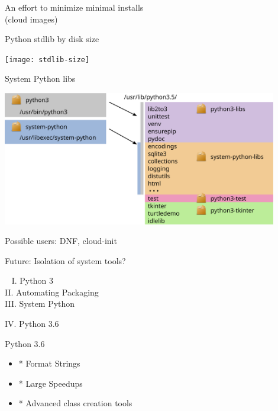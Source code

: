 \documentclass[1610,20pt]{beamer}
\newcommand\sk{\par\bigskip\bigskip\par}
\begin{document}
\begin{center}
\begin{frame}[fragile]
    \sk

    An effort to minimize minimal installs \\
    (cloud images)
\end{frame}

\begin{frame}[fragile]
    Python stdlib by disk size
    \sk

    \texttt{[image: stdlib-size]}
\end{frame}

\begin{frame}[fragile]
    System Python libs
    \sk

    \includegraphics[width=0.9\textwidth]{system-python}
\end{frame}

\begin{frame}[fragile]
    Possible users: DNF, cloud-init

    \sk\pause

    Future: Isolation of system tools?
\end{frame}

{
\begin{frame}[fragile]~
    {\color{mutegray} I. Python 3} \\
    {\color{mutegray} II. Automating Packaging} \\
    {\color{mutegray} III. System Python} \\

    \sk\color{white}

    \huge
    IV. Python 3.6
\end{frame}
}

\begin{frame}[fragile]
    Python 3.6

    \sk
    
    \small
    \begin{itemize}
    \item{*} Format Strings
    \item{*} Large Speedups
    \item{*} Advanced class creation tools
    \end{itemize}
\end{frame}


\end{center}
\end{document}
